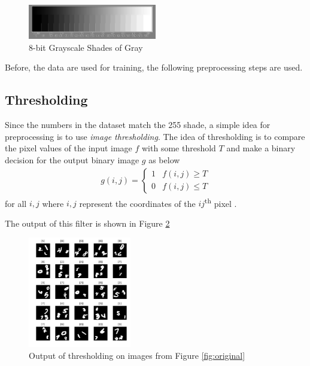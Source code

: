 \documentclass[letterpaper, 10 pt, conference]{ieeeconf}  %
\begin{document}
	
\begin{figure}[h]
	\begin{center}
			\includegraphics[width=0.5\textwidth]{figures/21stepwide8bit.jpg}  %
		\caption{8-bit Grayscale Shades of Gray}
		\label{fig:maxeig2}
	\end{center}
\end{figure}

Before, the data are used for training, the following preprocessing steps are used.

\subsection{Thresholding} 
Since the numbers in the dataset match the 255 shade, a simple idea for preprocessing is to use \textit{image thresholding}. 
The idea of thresholding is to compare the pixel values of the input image $f$ with some threshold $T$ and make a binary decision for the output binary image $g$ as below
\begin{align}
g(i,j) = \begin{cases}
1 & f(i,j)\ge T\\
0 & f(i,j)\le T
\end{cases}
\end{align}
for all $i, j$ where $i, j$ represent the coordinates of the $ij$\textsuperscript{th} pixel \cite{bovik2009essential}.

The output of this filter is shown in Figure \ref{fig:thresholded}

\begin{figure}
	\begin{center}
		\includegraphics[width=0.4\textwidth]{figures/thresholdDataset.pdf}  %
		\caption{Output of thresholding on images from Figure \ref{fig:original}}
		\label{fig:thresholded}
	\end{center}
\end{figure}
\end{document}
